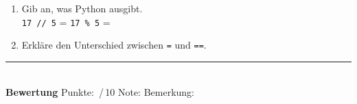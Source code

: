 \begin{Form}
\begin{enumerate}[(1)]
	\item Gib an, was Python ausgibt. \\
	\texttt{17 // 5} =  \qquad \texttt{17 \% 5} = 

	\item Erkläre den Unterschied zwischen \texttt{=} und \texttt{==}. 

\end{enumerate}

\bigskip
\noindent\textcolor{akzentrot}{\rule{\linewidth}{0.6pt}}\\[0.2cm]
{\color{akzentrot}\textbf{Bewertung} \quad Punkte: \,/\,10
\qquad Note:  \qquad Bemerkung: }


\end{Form}

